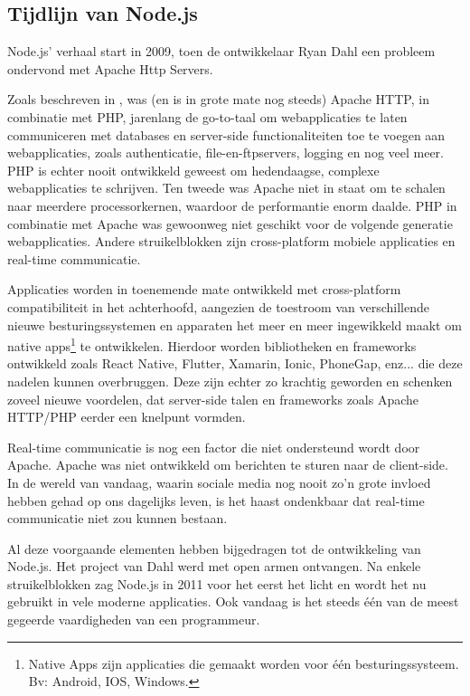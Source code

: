\subsection{Tijdlijn van Node.js}
\label{sec:nodeTimeline}
Node.js' verhaal start in 2009, toen de ontwikkelaar Ryan Dahl een probleem ondervond met Apache Http Servers. 

Zoals beschreven in \autocite{Chaniotis2015}, was (en is in grote mate nog steeds) Apache HTTP, in combinatie met PHP, jarenlang de go-to-taal om webapplicaties te laten communiceren met databases en server-side functionaliteiten toe te voegen aan \linebreak webapplicaties, zoals authenticatie, file-en-ftpservers, logging en nog veel meer. PHP is echter nooit ontwikkeld geweest om hedendaagse, complexe webapplicaties te schrijven. Ten tweede was Apache niet in staat om te schalen naar meerdere processorkernen, waardoor de performantie enorm daalde. PHP in combinatie met Apache was gewoonweg niet geschikt voor de volgende generatie webapplicaties. Andere struikelblokken zijn cross-platform mobiele applicaties en real-time communicatie.

Applicaties worden in toenemende mate ontwikkeld met cross-platform compatibiliteit in het achterhoofd, aangezien de toestroom van verschillende nieuwe besturingssystemen en apparaten het meer en meer ingewikkeld maakt om native apps\footnote{Native Apps zijn applicaties die gemaakt worden voor één besturingssysteem. Bv: Android, IOS, Windows.} te ontwikkelen. Hierdoor worden bibliotheken en frameworks ontwikkeld zoals React Native, Flutter, Xamarin, Ionic, PhoneGap, enz... die deze nadelen kunnen overbruggen. Deze zijn echter zo krachtig geworden en schenken zoveel nieuwe voordelen, dat server-side talen en frameworks zoals Apache HTTP/PHP eerder een knelpunt vormden. 

Real-time communicatie is nog een factor die niet ondersteund wordt door Apache. Apache was niet ontwikkeld om berichten te sturen naar de client-side. In de wereld van vandaag, waarin sociale media nog nooit zo'n grote invloed hebben gehad op ons dagelijks leven, is het haast ondenkbaar dat real-time communicatie niet zou kunnen bestaan. 

Al deze voorgaande elementen hebben bijgedragen tot de ontwikkeling van Node.js. Het project van Dahl werd met open armen ontvangen. Na enkele struikelblokken zag Node.js in 2011 voor het eerst het licht en wordt het nu gebruikt in vele moderne applicaties. Ook vandaag is het steeds één van de meest gegeerde vaardigheden van een programmeur. \autocite{Patel2018}

